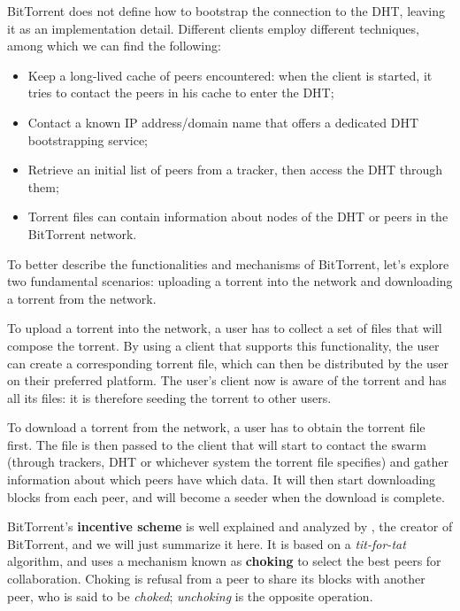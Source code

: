 \documentclass[mscthesis]{usiinfthesis}
\begin{document}
BitTorrent does not define how to bootstrap the connection to the DHT, leaving it as an implementation detail. Different clients employ different techniques, among which we can find the following:
\begin{itemize}
	\item Keep a long-lived cache of peers encountered: when the client is started, it tries to contact the peers in his cache to enter the DHT;
	\item Contact a known IP address/domain name that offers a dedicated DHT bootstrapping service;
	\item Retrieve an initial list of peers from a tracker, then access the DHT through them;
	\item Torrent files can contain information about nodes of the DHT or peers in the BitTorrent network.
\end{itemize}

To better describe the functionalities and mechanisms of BitTorrent, let's explore two fundamental scenarios: uploading a torrent into the network and downloading a torrent from the network.

To upload a torrent into the network, a user has to collect a set of files that will compose the torrent. By using a client that supports this functionality, the user can create a corresponding torrent file, which can then be distributed by the user on their preferred platform. The user's client now is aware of the torrent and has all its files: it is therefore seeding the torrent to other users.

To download a torrent from the network, a user has to obtain the torrent file first. The file is then passed to the client that will start to contact the swarm (through trackers, DHT or whichever system the torrent file specifies) and gather information about which peers have which data. It will then start downloading blocks from each peer, and will become a seeder when the download is complete.

BitTorrent's \textbf{incentive scheme} is well explained and analyzed by \cite{cohen2003incentives}, the creator of BitTorrent, and we will just summarize it here. It is based on a \textit{tit-for-tat} algorithm, and uses a mechanism known as \textbf{choking} to select the best peers for collaboration. Choking is refusal from a peer to share its blocks with another peer, who is said to be \textit{choked}; \textit{unchoking} is the opposite operation.
\end{document}
